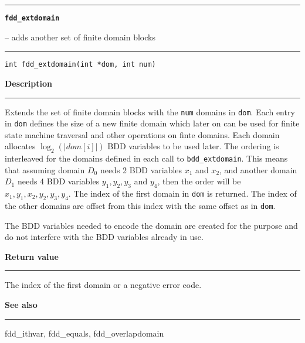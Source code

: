 \begin{minipage}{\textwidth}

\noindent\begin{minipage}{\textwidth}
\rule{\textwidth}{0.5mm}
{\tt\bf fdd\_extdomain }
\--- adds another set of finite domain blocks  \hspace{\fill}
\\\rule[1.5ex]{\textwidth}{0.5mm}
\end{minipage}

\noindent\begin{verbatim}
int fdd_extdomain(int *dom, int num) 
\end{verbatim}

\vspace{\parsep}\noindent
{\bf Description}\\\rule[1.5ex]{\textwidth}{0.2mm}\vspace{-1.5ex}\setlength{\parindent}{1em}
Extends the set of finite domain blocks with the {\tt num}
           domains in
           {\tt dom}. Each entry in {\tt dom} defines the size of a new
	   finite domain which later on can be used for finite state machine
	   traversal and other operations on finte domains. Each domain
	   allocates $\log_2(|dom[i]|)$ BDD variables to be used later.
	   The ordering is interleaved for the domains defined in each
	   call to {\tt bdd\_extdomain}. This means that assuming domain
	   $D_0$ needs 2 BDD variables $x_1$ and $x_2$, and another domain
	   $D_1$ needs 4 BDD variables $y_1,y_2,y_3$ and $y_4$, then the
	   order will be $x_1,y_1,x_2,y_2,y_3,y_4$. The index of the first
	   domain in {\tt dom} is returned. The index of the other domains
	   are offset from this index with the same offset as in {\tt dom}.

	   The BDD variables needed to encode the domain are created for the
	   purpose and do not interfere with the BDD variables already in
	   use. 

\setlength{\parindent}{0em}\vspace{\parsep}\vspace{\baselineskip}\noindent
{\bf Return value}\\\rule[1.5ex]{\textwidth}{0.2mm}\vspace{-1.5ex}
The index of the first domain or a negative error code. 

\vspace{\parsep}\vspace{\baselineskip}\noindent
{\bf See also}\\\rule[1.5ex]{\textwidth}{0.2mm}\vspace{-1.5ex}
fdd\_ithvar, fdd\_equals, fdd\_overlapdomain 
\end{minipage}
